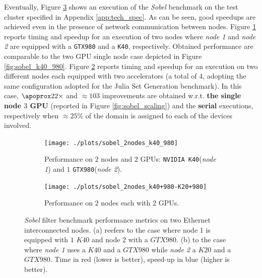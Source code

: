 Eventually, Figure \ref{fig:sobel_2nodes_performance} shows an execution of the \textit{Sobel} benchmark on the test cluster specified in Appendix \ref{app:tech_spec}. As can be seen, good speedups are achieved even in the presence of network communication between nodes. Figure \ref{fig:sobel_2nodes_k40_980} reports timing and speedup for an execution of two nodes where \textit{node 1} and \textit{node 2} are equipped with a \texttt{GTX980} and a \texttt{K40}, respectively. Obtained performance are comparable to the two GPU single node case depicted in Figure \ref{fig:sobel_k40_980}.
Figure \ref{fig:sobel_2nodes_k40+980-K20+980} reports timing and speedup for an execution on two different nodes each equipped with two accelerators  (a total of $4$, adopting the same configuration adopted for the Julia Set Generation benchmark). In this case, $\apoprox 22 \times$ and $\approx 103$ improvements are obtained w.r.t. \textbf{the single node $3$ GPU} (reported in Figure \ref{fig:sobel_scaling}) and the \textbf{serial} executions, respectively when $\approx 25\%$ of the domain is assigned to each of the devices involved.
\begin{figure}[!htb]
	\begin{subfigure}{1.0\textwidth}
		\caption{Performance on $2$ nodes and $2$ GPUs: \texttt{NVIDIA K40}(\textit{node 1}) and $1$ \texttt{GTX980}(\textit{node 2}).}
		\label{fig:sobel_2nodes_k40_980}
		\texttt{[image: ./plots/sobel\_2nodes\_k40\_980]}
		
	\end{subfigure}        
	\endminipage \hfill
	\vspace{5mm}
	\begin{subfigure}{1.0\textwidth}
		\texttt{[image: ./plots/sobel\_2nodes\_k40+980-K20+980]}
		\caption{Performance on $2$ nodes each with $2$ GPUs.}
		\label{fig:sobel_2nodes_k40+980-K20+980}
	\end{subfigure}
	\endminipage\hfill
	\caption[\textit{Sobel} filter benchmark performance metrics on two nodes.]{\textit{Sobel} filter benchmark performance metrics on two Ethernet interconnected nodes. (a) reefers to the case where node 1 is equipped with $1$ $K40$ and node 2 with a $GTX980$. (b) to the case where \textit{node 1} uses a $K40$ and a $GTX980$ while \textit{node 2} a $K20$ and a $GTX980$. Time in red (lower is better), speed-up in blue (higher is better).}
	\label{fig:sobel_2nodes_performance}
\end{figure}
